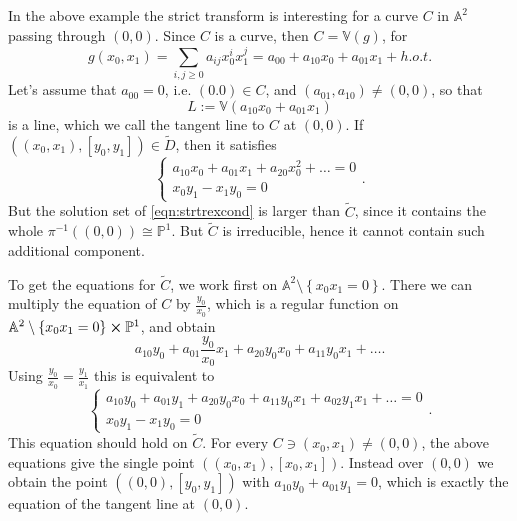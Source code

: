 \begin{ex}
	In the above example the strict transform is interesting for a curve $C$ in $\mathbb{A}^{2}$
	passing through $(0,0)$.
	Since $C$ is a curve, then $C = \mathbb{V}\left( g \right)$, for
	\begin{equation}
		g(x_0,x_1) = \sum_{i,j \geq 0}^{} a_{ij} x_0^i x_1^j = 
		a_{00} + a_{10} x_0 + a_{01} x_1 + h.o.t
	.\end{equation} 
	Let's assume that $a_{00} = 0$, i.e. $(0.0) \in C$, and $(a_{01}, a_{10}) \neq (0,0)$, so that
	\begin{equation}
	L := \mathbb{V}\left( a_{10} x_0 + a_{01} x_1 \right)
	\end{equation} 
	is a line, which we call the tangent line to $C$ at $(0,0)$.
	If $\left((x_0,x_1), [y_0,y_1]\right) \in \widetilde{D}$, then it satisfies
	\begin{equation}\label{eqn:strtrexcond}
	\begin{cases}
		a_{10}x_0 + a_{01}x_1 + a_{20}x_0^2 + \ldots = 0\\
		x_0y_1 - x_1y_0 = 0
	\end{cases} 
	.\end{equation} 
	But the solution set of \eqref{eqn:strtrexcond} is larger than $\widetilde{C}$, since
	it contains the whole $\pi^{-1} \left( (0,0) \right) \cong \mathbb{P}^{1}$.
	But $\widetilde{C}$ is irreducible, hence it cannot contain such additional component.

	To get the equations for $\widetilde{C}$, we work first on $\mathbb{A}^{2} \setminus \left\{ x_0x_1 = 0 \right\}$.
	There we can multiply the equation of $C$ by $\frac{y_0}{x_0}$, which is
	a regular function on $\mathbb{A}^{2} \setminus \left\{ x_0x_1 = 0 \right\} \cross \mathbb{P}^{1}$,
	and obtain
	\begin{equation}
	a_{10}y_0 + a_{01} \frac{y_0}{x_0} x_1 + a_{20} y_0 x_0 +
	a_{11} y_0 x_1 + \ldots
	.\end{equation} 
	Using $\frac{y_0}{x_0} = \frac{y_1}{x_1}$ this is equivalent to
	\begin{equation}
	\begin{cases}
		a_{10}y_0 + a_{01} y_1 + a_{20}y_0x_0 +
		a_{11}y_0x_1 + a_{02}y_1x_1 + \ldots = 0\\
		x_0y_1 - x_1y_0 = 0
	\end{cases} 
	.\end{equation} 
	This equation should hold on $\widetilde{C}$.
	For every $C \ni (x_0, x_1) \neq (0,0)$, the above equations give the
	single point $\left((x_0,x_1), [x_0,x_1]\right)$.
	Instead over $(0,0)$ we obtain the point $\left((0,0), [y_0,y_1]\right)$
	with $a_{10}y_0 + a_{01}y_1 = 0$, which is exactly the equation of the tangent line at $(0,0)$.
\end{ex} 

